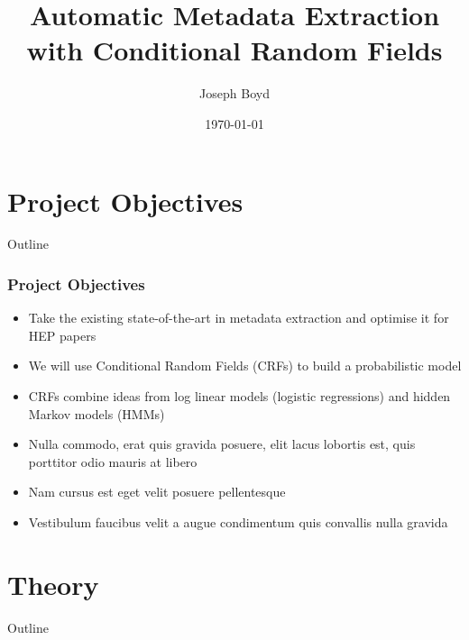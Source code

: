 \documentclass{beamer}
\title[Automatic Metadata Extraction]{Automatic Metadata Extraction with Conditional Random Fields} %
\author{Joseph Boyd} %
\institute[EPFL] %
{
\'Ecole Polytechnique F\'ed\'erale de Lausanne \\ %
\medskip
\textit{joseph.boyd@epfl.ch} %
}
\date{\today} %
\begin{document}
\begin{frame}
\titlepage %
\end{frame}


\section{Project Objectives}
\begin{frame}[noframenumbering]{Outline}
\tableofcontents[currentsection]
\end{frame}


\begin{frame}
\frametitle{Project Objectives}
\begin{itemize}
\item Take the existing state-of-the-art in metadata extraction and optimise it for HEP papers
\item We will use Conditional Random Fields (CRFs) to build a probabilistic model
\item CRFs combine ideas from log linear models (logistic regressions) and hidden Markov models (HMMs)
\item Nulla commodo, erat quis gravida posuere, elit lacus lobortis est, quis porttitor odio mauris at libero
\item Nam cursus est eget velit posuere pellentesque
\item Vestibulum faucibus velit a augue condimentum quis convallis nulla gravida
\end{itemize}
\end{frame}


\section{Theory}
\begin{frame}[noframenumbering]{Outline}
\tableofcontents[currentsection]
\end{frame}

\end{document}
